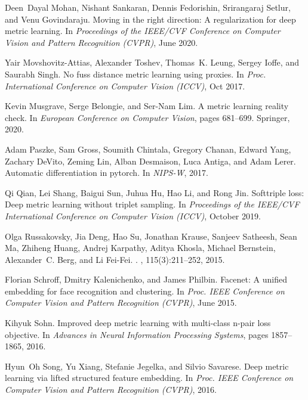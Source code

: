 \documentclass[10pt,twocolumn,letterpaper]{article}
\begin{document}
\begin{thebibliography}{10}
Deen~Dayal Mohan, Nishant Sankaran, Dennis Fedorishin, Srirangaraj Setlur, and
  Venu Govindaraju.
\newblock Moving in the right direction: A regularization for deep metric
  learning.
\newblock In {\em Proceedings of the IEEE/CVF Conference on Computer Vision and
  Pattern Recognition (CVPR)}, June 2020.

Yair Movshovitz-Attias, Alexander Toshev, Thomas~K. Leung, Sergey Ioffe, and
  Saurabh Singh.
\newblock No fuss distance metric learning using proxies.
\newblock In {\em Proc. International Conference on Computer Vision (ICCV)},
  Oct 2017.

Kevin Musgrave, Serge Belongie, and Ser-Nam Lim.
\newblock A metric learning reality check.
\newblock In {\em European Conference on Computer Vision}, pages 681--699.
  Springer, 2020.

Adam Paszke, Sam Gross, Soumith Chintala, Gregory Chanan, Edward Yang, Zachary
  DeVito, Zeming Lin, Alban Desmaison, Luca Antiga, and Adam Lerer.
\newblock Automatic differentiation in pytorch.
\newblock In {\em NIPS-W}, 2017.

Qi Qian, Lei Shang, Baigui Sun, Juhua Hu, Hao Li, and Rong Jin.
\newblock Softtriple loss: Deep metric learning without triplet sampling.
\newblock In {\em Proceedings of the IEEE/CVF International Conference on
  Computer Vision (ICCV)}, October 2019.

Olga Russakovsky, Jia Deng, Hao Su, Jonathan Krause, Sanjeev Satheesh, Sean Ma,
  Zhiheng Huang, Andrej Karpathy, Aditya Khosla, Michael Bernstein,
  Alexander~C. Berg, and Li Fei-Fei.
.
,
  115(3):211--252, 2015.

Florian Schroff, Dmitry Kalenichenko, and James Philbin.
\newblock Facenet: A unified embedding for face recognition and clustering.
\newblock In {\em Proc. IEEE Conference on Computer Vision and Pattern
  Recognition (CVPR)}, June 2015.

Kihyuk Sohn.
\newblock Improved deep metric learning with multi-class n-pair loss objective.
\newblock In {\em Advances in Neural Information Processing Systems}, pages
  1857--1865, 2016.

Hyun~Oh Song, Yu Xiang, Stefanie Jegelka, and Silvio Savarese.
\newblock Deep metric learning via lifted structured feature embedding.
\newblock In {\em Proc. IEEE Conference on Computer Vision and Pattern
  Recognition (CVPR)}, 2016.


\end{thebibliography}
\end{document}
